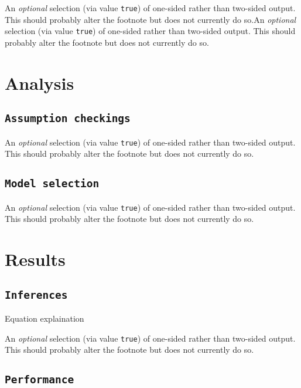 \documentclass[letterpaper,9pt,twocolumn,twoside,]{pinp}
\begin{document}
An \emph{optional} selection (via value \texttt{true}) of one-sided
rather than two-sided output. This should probably alter the footnote
but does not currently do so.An \emph{optional} selection (via value
\texttt{true}) of one-sided rather than two-sided output. This should
probably alter the footnote but does not currently do so.

\hypertarget{analysis}{%
\section{Analysis}\label{analysis}}

\hypertarget{assumption-checkings}{%
\subsection{\texorpdfstring{\texttt{Assumption\ checkings}}{Assumption checkings}}\label{assumption-checkings}}

An \emph{optional} selection (via value \texttt{true}) of one-sided
rather than two-sided output. This should probably alter the footnote
but does not currently do so.

\hypertarget{model-selection}{%
\subsection{\texorpdfstring{\texttt{Model\ selection}}{Model selection}}\label{model-selection}}

An \emph{optional} selection (via value \texttt{true}) of one-sided
rather than two-sided output. This should probably alter the footnote
but does not currently do so.

\hypertarget{results}{%
\section{Results}\label{results}}

\hypertarget{inferences}{%
\subsection{\texorpdfstring{\texttt{Inferences}}{Inferences}}\label{inferences}}

Equation explaination

An \emph{optional} selection (via value \texttt{true}) of one-sided
rather than two-sided output. This should probably alter the footnote
but does not currently do so.

\hypertarget{performance}{%
\subsection{\texorpdfstring{\texttt{Performance}}{Performance}}\label{performance}}
\end{document}
